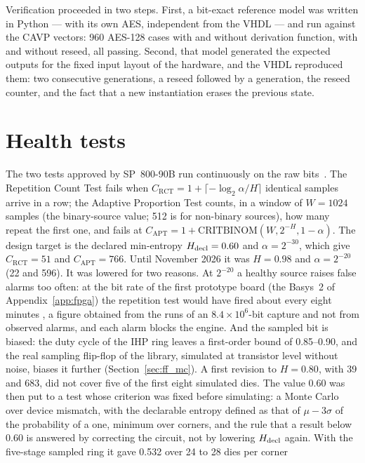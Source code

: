 Verification proceeded in two steps. First, a bit-exact reference model
was written in Python --- with its own AES, independent from the VHDL ---
and run against the CAVP vectors: 960 AES-128 cases with and without
derivation function, with and without reseed, all passing. Second, that
model generated the expected outputs for the fixed input layout of the
hardware, and the VHDL reproduced them: two consecutive generations, a
reseed followed by a generation, the reseed counter, and the fact that a
new instantiation erases the previous state.

\section{Health tests}
\label{sec:health}

The two tests approved by SP~800-90B run continuously on the raw
bits~\cite{turan_2018_sp80090b}. The Repetition Count Test fails when
$C_{\mathrm{RCT}} = 1 + \lceil -\log_2\alpha / H \rceil$ identical samples
arrive in a row; the Adaptive Proportion Test counts, in a window of
$W = 1024$ samples (the binary-source value; 512 is for non-binary
sources), how many repeat the first one, and fails at
$C_{\mathrm{APT}} = 1 + \mathrm{CRITBINOM}(W, 2^{-H}, 1-\alpha)$. The
design target is the declared min-entropy $H_{\mathrm{decl}} = 0.60$ and
$\alpha = 2^{-30}$, which give
$C_{\mathrm{RCT}} = 51$ and $C_{\mathrm{APT}} = 766$. Until November 2026
it was $H = 0.98$ and $\alpha = 2^{-20}$ (22 and 596). It was lowered for
two reasons. At $2^{-20}$ a healthy source raises false alarms too often:
at the bit rate of the first prototype board (the Basys~2 of
Appendix~\ref{app:fpga}) the repetition test would have fired about every
eight minutes \est{}, a figure obtained from the runs of an
$8.4\times10^6$-bit capture and not from observed alarms, and each alarm
blocks the engine. And the sampled
bit is biased: the duty cycle of the IHP ring leaves a first-order bound of
0.85--0.90, and the real sampling flip-flop of the library, simulated at
transistor level without noise, biases it further
(Section~\ref{sec:ff_mc}). A first revision to $H = 0.80$, with
39 and 683, did not cover five of the first eight simulated dies. The
value 0.60 was then put to a test whose criterion was fixed before
simulating: a Monte Carlo over device mismatch, with the declarable
entropy defined as that of $\mu - 3\sigma$ of the probability of a one,
minimum over corners, and the rule that a result below 0.60 is answered
by correcting the circuit, not by lowering $H_{\mathrm{decl}}$ again. With the
five-stage sampled ring it gave 0.532 over 24 to 28 dies per corner
